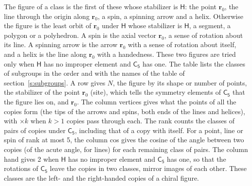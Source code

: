 \documentclass[10pt,a4paper]{article}
\numberwithin{equation}{section}
\newcommand{\grp}[1]{\mathsf{#1}}
\newcommand{\pointr}{\mathbf{r}}
\begin{document}
\leavevmode\label{n:head.figure}The figure of a class is the first of these whose stabilizer is $\grp{H}$: the point $\pointr_0$, the line through the origin along $\pointr_0$, a spin, a spinning arrow and a helix. Otherwise the figure is the least orbit of $\pointr_0$ under $\grp{H}$ whose stabilizer is $\grp{H}$, a segment, a polygon or a polyhedron. A spin is the axial vector $\pointr_0$, a sense of rotation about its line. A spinning arrow is the arrow $\pointr_0$ with a sense of rotation about itself, and a helix is the line along $\pointr_0$ with a handedness. These two figures are tried only when $\grp{H}$ has no improper element and $\grp{C_{5}}$ has one. The table lists the classes of subgroups in the order and with the names of the table of section~\ref{s:subgroups}. \label{n:head.site}A row gives $N$, the figure by its shape or number of points, the stabilizer of the point $\pointr_0$ (site), which tells the symmetry elements of $\grp{C_{5}}$ that the figure lies on, and $\pointr_0$. \label{n:head.vertices}The column vertices gives what the points of all the copies form (the tips of the arrows and spins, both ends of the lines and helices), with ${\times}k$ when $k > 1$ copies pass through each. \label{n:head.rank}The rank counts the classes of pairs of copies under $\grp{C_{5}}$, including that of a copy with itself. \label{n:head.cos}For a point, line or spin of rank at most 5, the column cos gives the cosine of the angle between two copies (of the acute angle, for lines) for each remaining class of pairs. \label{n:head.hand}The column hand gives 2 when $\grp{H}$ has no improper element and $\grp{C_{5}}$ has one, so that the rotations of $\grp{C_{5}}$ leave the copies in two classes, mirror images of each other. These classes are the left- and the right-handed copies of a chiral figure.
\end{document}

